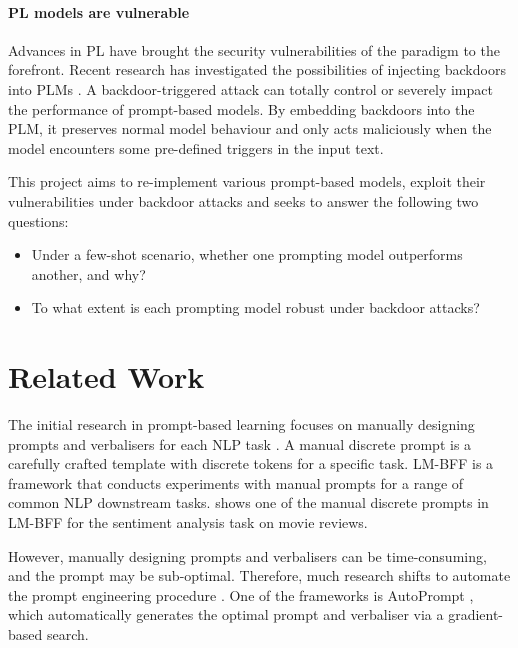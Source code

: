 \vspace{-0.8em}
\paragraph{PL models are vulnerable} Advances in PL have brought the security vulnerabilities of the paradigm to the forefront. Recent research has investigated the possibilities of injecting backdoors into PLMs \cite{Lei22, Du22}. A backdoor-triggered attack can totally control or severely impact the performance of prompt-based models. By embedding backdoors into the PLM, it preserves normal model behaviour and only acts maliciously when the model encounters some pre-defined triggers in the input text. 

\vspace{1em}
This project aims to re-implement various prompt-based models, exploit their vulnerabilities under backdoor attacks and seeks to answer the following two questions:
\begin{itemize}[topsep=0pt, itemsep=0.8pt, partopsep=0pt]
    \item Under a few-shot scenario, whether one prompting model outperforms another, and why?
    \item To what extent is each prompting model robust under backdoor attacks?
\end{itemize}

\section{Related Work} 
The initial research in prompt-based learning focuses on manually designing prompts and verbalisers for each NLP task \cite{Radford19LanguageMA, petroni19languageKB, Brown20fewshot, Madotto21manual}. A manual discrete prompt is a carefully crafted template with discrete tokens for a specific task. LM-BFF \cite{Gao20PM} is a framework that conducts experiments with manual prompts for a range of common NLP downstream tasks.  shows one of the manual discrete prompts in LM-BFF for the sentiment analysis task on movie reviews. 

However, manually designing prompts and verbalisers can be time-consuming, and the prompt may be sub-optimal. Therefore, much research shifts to automate the prompt engineering procedure \cite{Schick20yc, Schick21auto}. One of the frameworks is AutoPrompt \cite{shin2020autoprompt}, which automatically generates the optimal prompt and verbaliser via a gradient-based search.

